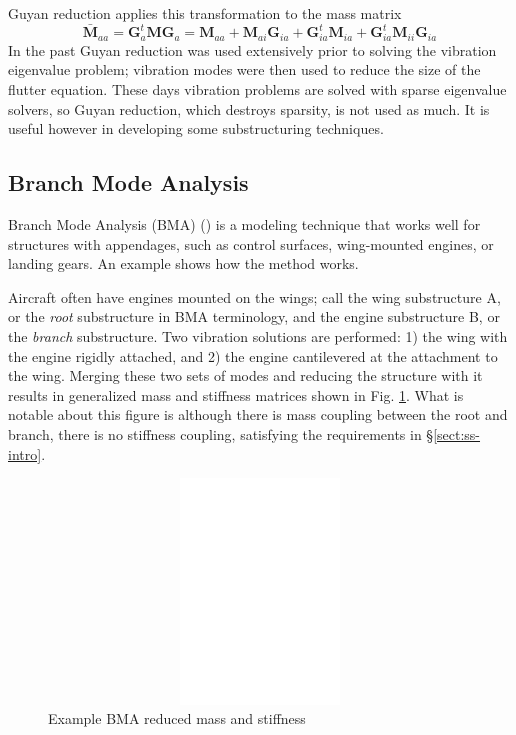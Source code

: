 \documentclass[11pt,openany,twoside]{book}
\numberwithin{equation}{section}		%
\newcommand{\Newterm}[1]{{\em #1}}	%
\newcommand{\Matrix}[1]{\boldsymbol{#1}}
\newcommand{\Sectref}[1]{\S\ref{#1}}
\newcommand{\Figref}[1]{Fig. \ref{#1}}  %
\begin{document}
Guyan reduction \cite{guyan1965reduction}
applies this transformation to the mass matrix
\begin{equation}\label{eqn:guyanM}
\Matrix{\bar{M}}_{aa} = \Matrix{G}_a^t\Matrix{M}\Matrix{G}_a =
	\Matrix{M}_{aa} + \Matrix{M}_{ai}\Matrix{G}_{ia}
		+ \Matrix{G}_{ia}^t \Matrix{M}_{ia}
			+ \Matrix{G}_{ia}^t\Matrix{M}_{ii}\Matrix{G}_{ia}
\end{equation}
In the past Guyan reduction was used extensively prior to solving
the vibration eigenvalue problem; vibration modes were then used to
reduce the size of the flutter equation.
These days vibration problems are solved with sparse eigenvalue solvers,
so Guyan reduction, which destroys sparsity, is not used as much.
It is useful however in developing some substructuring techniques.

\subsection{Branch Mode Analysis}\label{sect:bma}
Branch Mode Analysis (BMA) (\cite{gladwell1964branch}) is a modeling technique that
works well for structures with appendages, such as control surfaces,
wing-mounted engines, or landing gears.  An example shows how the method
works.

Aircraft often have engines mounted on the wings; call the wing
substructure A, or the \Newterm{root} substructure in BMA terminology,
and the engine substructure B, or the \Newterm{branch} substructure.
Two vibration solutions are performed: 1) the wing with the engine rigidly attached,
and 2) the engine cantilevered at the attachment to the wing. Merging these two
sets of modes and reducing the structure with it results in generalized mass and
stiffness matrices shown in \Figref{fig:bm-km}.  What is notable about this figure is
although there is mass coupling between the root and branch, there
is no stiffness coupling, satisfying the requirements in \Sectref{sect:ss-intro}.

\begin{figure}
\centering
	\includegraphics[height=6cm,width=12cm]{bmodes.eps}
\caption{Example BMA reduced mass and stiffness}\label{fig:bm-km}
\end{figure}
\end{document}

